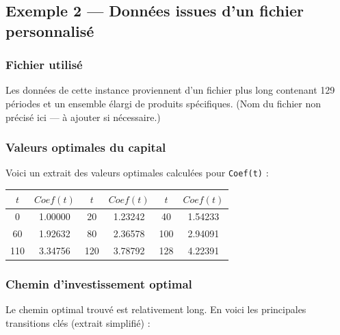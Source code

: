 \documentclass[a4paper,11pt]{article}
\begin{document}
\subsection{Exemple 2 — Données issues d’un fichier personnalisé}

\subsubsection{Fichier utilisé}

Les données de cette instance proviennent d’un fichier plus long contenant 129 périodes et un ensemble élargi de produits spécifiques.  
(Nom du fichier non précisé ici — à ajouter si nécessaire.)

\vspace{0.3cm}

\subsubsection{Valeurs optimales du capital}

Voici un extrait des valeurs optimales calculées pour \texttt{Coef(t)} :

\begin{center}
\begin{tabular}{|c|c||c|c||c|c|}
\hline
$t$ & $Coef(t)$ & $t$ & $Coef(t)$ & $t$ & $Coef(t)$ \\
\hline
0 & 1.00000 & 20 & 1.23242 & 40 & 1.54233 \\
60 & 1.92632 & 80 & 2.36578 & 100 & 2.94091 \\
110 & 3.34756 & 120 & 3.78792 & 128 & 4.22391 \\
\hline
\end{tabular}
\end{center}

\vspace{0.4cm}

\subsubsection{Chemin d’investissement optimal}

Le chemin optimal trouvé est relativement long. En voici les principales transitions clés (extrait simplifié) :
\end{document}

